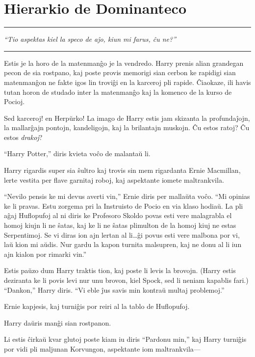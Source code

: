 \chapter{Hierarkio de Dominanteco}

\begin{center}\rule{3in}{0.4pt}\end{center}

\emph{``Tio aspektas kiel la speco de aĵo, kiun mi farus, ĉu ne?''}

\begin{center}\rule{3in}{0.4pt}\end{center}

Estis je la horo de la matenmanĝo je la vendredo. Harry prenis alian
grandegan pecon de sia rostpano, kaj poste provis memorigi sian cerbon
ke rapidigi sian matenmanĝon ne fakte igos lin troviĝi en la karceroj
pli rapide. Ĉiaokaze, ili havis tutan horon de studado inter la
matenmanĝo kaj la komenco de la kurso de Pocioj.

Sed karceroj! en Herpŭrko! La imago de Harry estis jam skizanta la
profundaĵojn, la mallarĝajn pontojn, kandeligojn, kaj la brilantajn
muskojn. Ĉu estos ratoj? Ĉu estos \emph{drakoj}?

``Harry Potter,'' diris kvieta voĉo de malantaŭ li.

Harry rigardis super sia ŝultro kaj trovis sin mem rigardanta Ernie
Macmillan, lerte vestita per flave garnitaj roboj, kaj aspektante
iomete maltrankvila.

``Nevilo pensis ke mi devus averti vin,'' Ernie diris per mallaŭta
voĉo. ``Mi opinias ke li pravas. Estu zorgema pri la Instruisto de
Pocio en via klaso hodiaŭ. La pli aĝaj Huflopufoj al ni diris ke
Profesoro Skoldo povas esti vere malagrabla el homoj kiujn li ne
ŝatas, kaj ke li ne ŝatas plimulton de la homoj kiuj ne estas
Serpentimoj. Se vi diras ion ajn lertan al li\ldots ĝi povus esti vere
malbona por vi, laŭ kion mi aŭdis. Nur gardu la kapon turnita
malsupren, kaj ne donu al li iun ajn kialon por rimarki vin.''

Estis paŭzo dum Harry traktis tion, kaj poste li levis la
brovojn. (Harry estis deziranta ke li povis levi nur unu brovon, kiel
Spock, sed li neniam kapablis fari.) ``Dankon,'' Harry diris. ``Vi
eble ĵus savis min kontraŭ multaj problemoj.''

Ernie kapjesis, kaj turniĝis por reiri al la tablo de Huflopufoj.

Harry daŭris manĝi sian rostpanon.

Li estis ĉirkaŭ kvar glutoj poste kiam iu diris ``Pardonu min,'' kaj
Harry turniĝis por vidi pli maljunan Korvungon, aspektante iom
maltrankvila—

